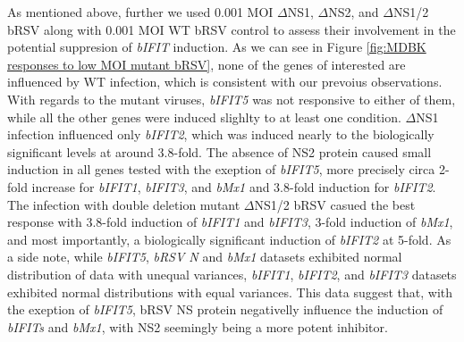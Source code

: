 As mentioned above, further we used 0.001 MOI \(\Delta\)NS1, \(\Delta\)NS2, and \(\Delta\)NS1/2 bRSV along with 0.001 MOI WT bRSV control to assess their involvement in the potential suppresion of \textit{bIFIT} induction. As we can see in Figure \ref{fig:MDBK responses to low MOI mutant bRSV}, none of the genes of interested are influenced by WT infection, which is consistent with our prevoius observations. With regards to the mutant viruses, \textit{bIFIT5} was not responsive to either of them, while all the other genes were induced slighlty to at least one condition. \(\Delta\)NS1 infection influenced only \textit{bIFIT2}, which was induced nearly to the biologically significant levels at around 3.8-fold. The absence of NS2 protein caused small induction in all genes tested with the exeption of \textit{bIFIT5}, more precisely circa 2-fold increase for \textit{bIFIT1}, \textit{bIFIT3}, and \textit{bMx1} and 3.8-fold induction for \textit{bIFIT2}. The infection with double deletion mutant \(\Delta\)NS1/2 bRSV casued the best response with 3.8-fold induction of \textit{bIFIT1} and \textit{bIFIT3}, 3-fold induction of \textit{bMx1}, and most importantly, a biologically significant induction of \textit{bIFIT2} at 5-fold. As a side note, while \textit{bIFIT5}, \textit{bRSV N} and \textit{bMx1} datasets exhibited normal distribution of data with unequal variances, \textit{bIFIT1}, \textit{bIFIT2}, and \textit{bIFIT3} datasets exhibited normal distributions with equal variances. This data suggest that, with the exeption of \textit{bIFIT5}, bRSV NS protein negativelly influence the induction of \textit{bIFITs} and \textit{bMx1}, with NS2 seemingly being a more potent inhibitor.

